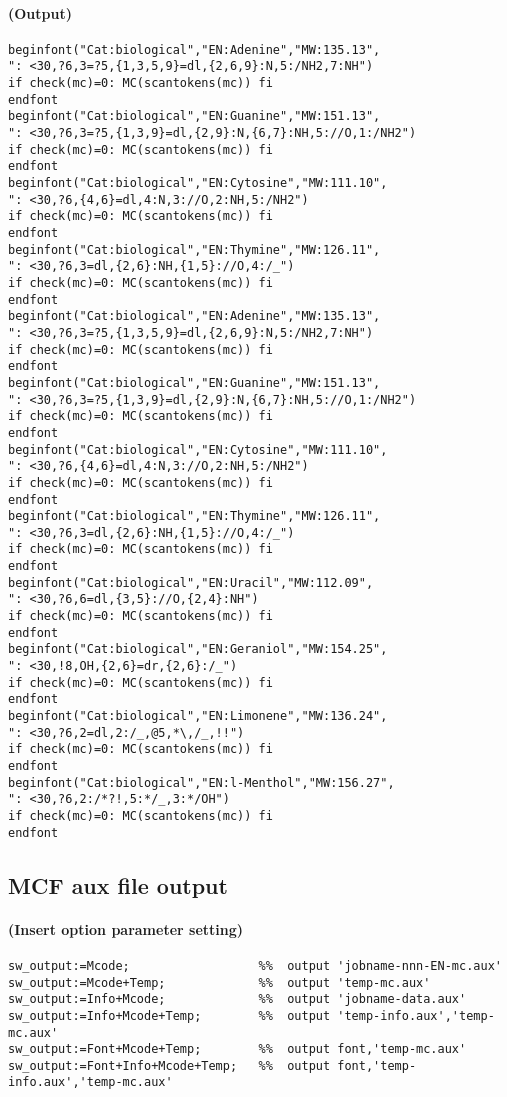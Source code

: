 \documentclass[a4paper]{article}
\begin{document}
\paragraph{(Output)}
\begin{verbatim}
beginfont("Cat:biological","EN:Adenine","MW:135.13",
": <30,?6,3=?5,{1,3,5,9}=dl,{2,6,9}:N,5:/NH2,7:NH")
if check(mc)=0: MC(scantokens(mc)) fi
endfont
beginfont("Cat:biological","EN:Guanine","MW:151.13",
": <30,?6,3=?5,{1,3,9}=dl,{2,9}:N,{6,7}:NH,5://O,1:/NH2")
if check(mc)=0: MC(scantokens(mc)) fi
endfont
beginfont("Cat:biological","EN:Cytosine","MW:111.10",
": <30,?6,{4,6}=dl,4:N,3://O,2:NH,5:/NH2")
if check(mc)=0: MC(scantokens(mc)) fi
endfont
beginfont("Cat:biological","EN:Thymine","MW:126.11",
": <30,?6,3=dl,{2,6}:NH,{1,5}://O,4:/_")
if check(mc)=0: MC(scantokens(mc)) fi
endfont
beginfont("Cat:biological","EN:Adenine","MW:135.13",
": <30,?6,3=?5,{1,3,5,9}=dl,{2,6,9}:N,5:/NH2,7:NH")
if check(mc)=0: MC(scantokens(mc)) fi
endfont
beginfont("Cat:biological","EN:Guanine","MW:151.13",
": <30,?6,3=?5,{1,3,9}=dl,{2,9}:N,{6,7}:NH,5://O,1:/NH2")
if check(mc)=0: MC(scantokens(mc)) fi
endfont
beginfont("Cat:biological","EN:Cytosine","MW:111.10",
": <30,?6,{4,6}=dl,4:N,3://O,2:NH,5:/NH2")
if check(mc)=0: MC(scantokens(mc)) fi
endfont
beginfont("Cat:biological","EN:Thymine","MW:126.11",
": <30,?6,3=dl,{2,6}:NH,{1,5}://O,4:/_")
if check(mc)=0: MC(scantokens(mc)) fi
endfont
beginfont("Cat:biological","EN:Uracil","MW:112.09",
": <30,?6,6=dl,{3,5}://O,{2,4}:NH")
if check(mc)=0: MC(scantokens(mc)) fi
endfont
beginfont("Cat:biological","EN:Geraniol","MW:154.25",
": <30,!8,OH,{2,6}=dr,{2,6}:/_")
if check(mc)=0: MC(scantokens(mc)) fi
endfont
beginfont("Cat:biological","EN:Limonene","MW:136.24",
": <30,?6,2=dl,2:/_,@5,*\,/_,!!")
if check(mc)=0: MC(scantokens(mc)) fi
endfont
beginfont("Cat:biological","EN:l-Menthol","MW:156.27",
": <30,?6,2:/*?!,5:*/_,3:*/OH")
if check(mc)=0: MC(scantokens(mc)) fi
endfont
\end{verbatim}
\noindent%
\newpage
\subsection{MCF aux file output}
\paragraph{(Insert option parameter setting)}
%
%
\begin{verbatim}
sw_output:=Mcode;                  %%  output 'jobname-nnn-EN-mc.aux'
sw_output:=Mcode+Temp;             %%  output 'temp-mc.aux'
sw_output:=Info+Mcode;             %%  output 'jobname-data.aux'
sw_output:=Info+Mcode+Temp;        %%  output 'temp-info.aux','temp-mc.aux'
sw_output:=Font+Mcode+Temp;        %%  output font,'temp-mc.aux'
sw_output:=Font+Info+Mcode+Temp;   %%  output font,'temp-info.aux','temp-mc.aux'
\end{verbatim}
\end{document}
